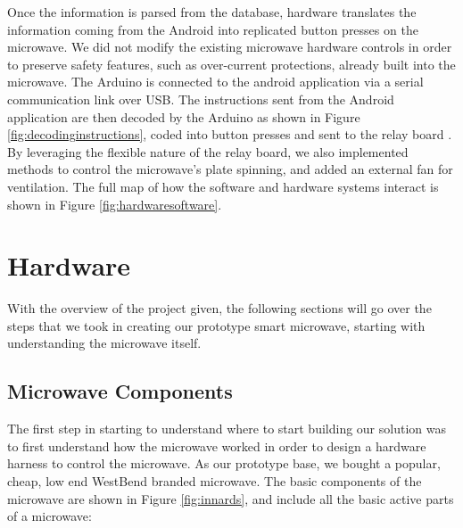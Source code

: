 \documentclass[10pt,journal,letterpaper,twocolumn]{IEEEtran}
\begin{document}
Once the information is parsed from the database, hardware translates the information coming from the Android into replicated button presses on the microwave.  We did not modify the existing microwave hardware controls in order to preserve safety features, such as over-current protections, already built into the microwave.  The Arduino is connected to the android application via a serial communication link over USB.  The instructions sent from the Android application are then decoded by the Arduino as shown in Figure \ref{fig:decodinginstructions}, coded into button presses and sent to the relay board \cite{raspberryPicrowaveRepo}.  By leveraging the flexible nature of the relay board, we also implemented methods to control the microwave's plate spinning, and added an external fan for ventilation.  The full map of how the software and hardware systems interact is shown in Figure \ref{fig:hardwaresoftware}.

\section{Hardware}
With the overview of the project given, the following sections will go over the steps that we took in creating our prototype smart microwave, starting with understanding the microwave itself.

\subsection*{Microwave Components}
The first step in starting to understand where to start building our solution was to first understand how the microwave worked in order to design a hardware harness to control the microwave.  As our prototype base, we bought a popular, cheap, low end WestBend branded microwave.  The basic components of the microwave are shown in Figure \ref{fig:innards}, and include all the basic active parts of a microwave:
\end{document}
